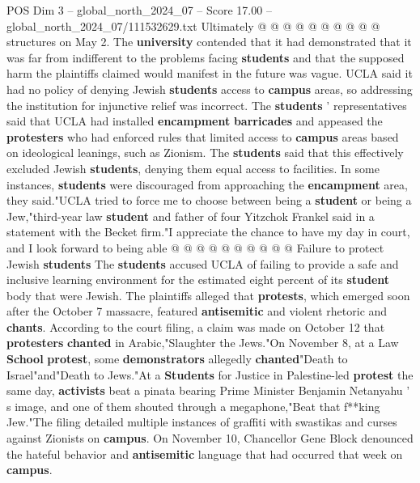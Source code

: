 \begin{textsample}{POS Dim 3 – global\_north\_2024\_07 – Score 17.00 – global\_north\_2024\_07/111532629.txt}
Ultimately @ @ @ @ @ @ @ @ @ @ structures on May 2.
The \textbf{university} contended that it had demonstrated that it was far from indifferent to the problems facing \textbf{students} and that the supposed harm the plaintiffs claimed would manifest in the future was vague.
UCLA said it had no policy of denying Jewish \textbf{students} access to \textbf{campus} areas, so addressing the institution for injunctive relief was incorrect.
The \textbf{students} ' representatives said that UCLA had installed \textbf{encampment} \textbf{barricades} and appeased the \textbf{protesters} who had enforced rules that limited access to \textbf{campus} areas based on ideological leanings, such as Zionism.
The \textbf{students} said that this effectively excluded Jewish \textbf{students}, denying them equal access to facilities.
In some instances, \textbf{students} were discouraged from approaching the \textbf{encampment} area, they said."UCLA tried to force me to choose between being a \textbf{student} or being a Jew,"third-year law \textbf{student} and father of four Yitzchok Frankel said in a statement with the Becket firm."I appreciate the chance to have my day in court, and I look forward to being able @ @ @ @ @ @ @ @ @ @ Failure to protect Jewish \textbf{students} The \textbf{students} accused UCLA of failing to provide a safe and inclusive learning environment for the estimated eight percent of its \textbf{student} body that were Jewish.
The plaintiffs alleged that \textbf{protests}, which emerged soon after the October 7 massacre, featured \textbf{antisemitic} and violent rhetoric and \textbf{chants}.
According to the court filing, a claim was made on October 12 that \textbf{protesters} \textbf{chanted} in Arabic,"Slaughter the Jews."On November 8, at a Law \textbf{School} \textbf{protest}, some \textbf{demonstrators} allegedly \textbf{chanted}"Death to Israel"and"Death to Jews."At a \textbf{Students} for Justice in Palestine-led \textbf{protest} the same day, \textbf{activists} beat a pinata bearing Prime Minister Benjamin Netanyahu ' s image, and one of them shouted through a megaphone,"Beat that f**king Jew."The filing detailed multiple instances of graffiti with swastikas and curses against Zionists on \textbf{campus}.
On November 10, Chancellor Gene Block denounced the hateful behavior and \textbf{antisemitic} language that had occurred that week on \textbf{campus}.

\end{textsample}
